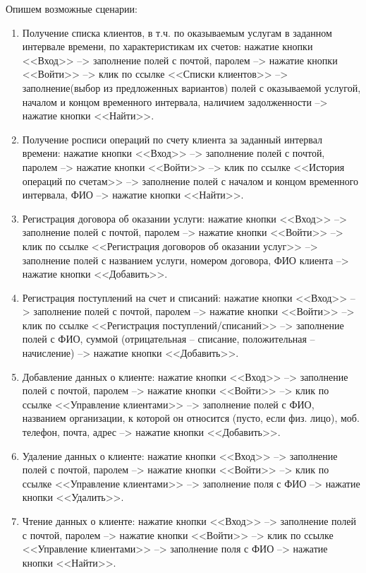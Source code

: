 \documentclass[oneside,senior,etd]{BYUPhysForDegree}
\begin{document}
Опишем возможные сценарии: 
\begin{enumerate}
    \item Получение списка клиентов, в т.ч. по оказываемым услугам в заданном интервале времени, по характеристикам их счетов:
    нажатие кнопки <<Вход>> --> заполнение полей с почтой, паролем --> нажатие кнопки <<Войти>> --> клик по ссылке <<Списки клиентов>> --> заполнение(выбор из предложенных вариантов) полей с оказываемой услугой, началом и концом временного интервала, наличием задолженности --> нажатие кнопки <<Найти>>.

    \item Получение росписи операций по счету клиента за заданный интервал времени:
    нажатие кнопки <<Вход>> --> заполнение полей с почтой, паролем --> нажатие кнопки <<Войти>> --> клик по ссылке <<История операций по счетам>> --> заполнение полей с началом и концом временного интервала, ФИО --> нажатие кнопки <<Найти>>.

    \item Регистрация договора об оказании услуги:
    нажатие кнопки <<Вход>> --> заполнение полей с почтой, паролем --> нажатие кнопки <<Войти>> --> клик по ссылке <<Регистрация договоров об оказании услуг>> --> заполнение полей с названием услуги, номером договора, ФИО клиента --> нажатие кнопки <<Добавить>>.

    \item Регистрация поступлений на счет и списаний:
    нажатие кнопки <<Вход>> --> заполнение полей с почтой, паролем --> нажатие кнопки <<Войти>> --> клик по ссылке <<Регистрация поступлений/списаний>> --> заполнение полей с ФИО, суммой (отрицательная -- списание, положительная -- начисление) --> нажатие кнопки <<Добавить>>.

    \item Добавление данных о клиенте:
    нажатие кнопки <<Вход>> --> заполнение полей с почтой, паролем --> нажатие кнопки <<Войти>> --> клик по ссылке <<Управление клиентами>> --> заполнение полей с ФИО, названием организации, к которой он относится (пусто, если физ. лицо), моб. телефон, почта, адрес --> нажатие кнопки <<Добавить>>.

    \item Удаление данных о клиенте:
    нажатие кнопки <<Вход>> --> заполнение полей с почтой, паролем --> нажатие кнопки <<Войти>> --> клик по ссылке <<Управление клиентами>> --> заполнение поля с ФИО --> нажатие кнопки <<Удалить>>.

    \item Чтение данных о клиенте:
    нажатие кнопки <<Вход>> --> заполнение полей с почтой, паролем --> нажатие кнопки <<Войти>> --> клик по ссылке <<Управление клиентами>> --> заполнение поля с ФИО --> нажатие кнопки <<Найти>>.


\end{enumerate}
\end{document}
